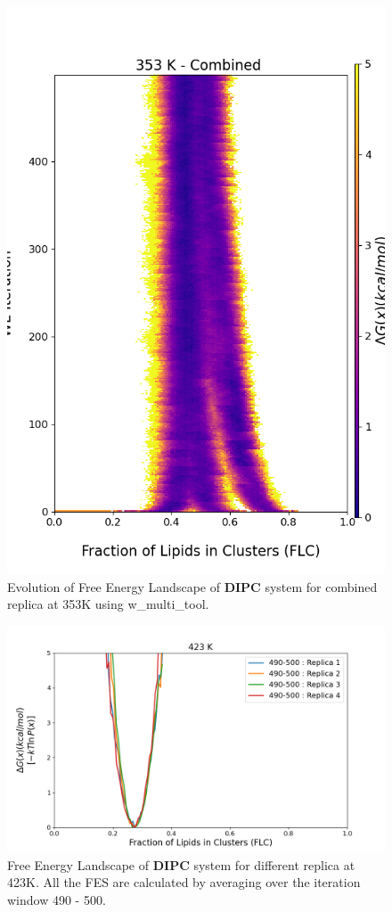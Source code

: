 \documentclass{biophys-new}
\begin{document}
\begin{figure}[hbt!]
\centering
\includegraphics[width=0.8\linewidth]{all_plots/ClusterLipids2Total/DPPC_DIPC_CHOL/353K/Evolution_DIPC_MULTI__353_ClusterLipids2Total.png}
\caption{Evolution of Free Energy Landscape of \textbf{DIPC} system for combined replica at 353K using w\_multi\_tool.}
\label{fig:view}

\end{figure}


\begin{figure}[hbt!]
\centering
\includegraphics[width=1.1\linewidth]{all_plots/ClusterLipids2Total/DPPC_DIPC_CHOL/423K/Average_DIPC_423_ClusterLipids2Total.png}
\caption{Free Energy Landscape of \textbf{DIPC} system for different replica at 423K. All the FES are calculated by averaging over the iteration window 490 - 500.}
\label{fig:view}

\end{figure}
\end{document}
